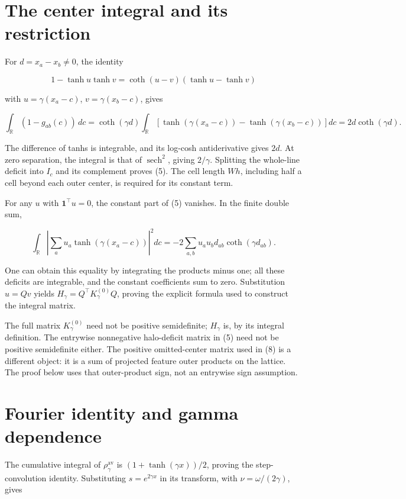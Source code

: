 \documentclass[11pt]{article}
\begin{document}
\clearpage\appendix
\section{The center integral and its restriction}

For \(d=x_a-x_b\ne0\), the identity

\[
1-\tanh u\tanh v=\coth(u-v)(\tanh u-\tanh v)
\]

with \(u=\gamma(x_a-c)\), \(v=\gamma(x_b-c)\), gives

\[
\int_{\mathbb R}(1-g_{ab}(c))\,dc
=\coth(\gamma d)\int_{\mathbb R}
[\tanh(\gamma(x_a-c))-\tanh(\gamma(x_b-c))]dc
=2d\coth(\gamma d).
\]

The difference of tanhs is integrable, and its log-cosh antiderivative gives \(2d\). At zero separation, the integral is that of \(\operatorname{sech}^2\), giving \(2/\gamma\). Splitting the whole-line deficit into \(I_c\) and its complement proves (5). The cell length \(Wh\), including half a cell beyond each outer center, is required for its constant term.

For any \(u\) with \(\mathbf1^\top u=0\), the constant part of (5) vanishes. In the finite double sum,

\[
\int_{\mathbb R}\left|\sum_a u_a\tanh(\gamma(x_a-c))\right|^2dc
=-2\sum_{a,b}u_a u_b d_{ab}\coth(\gamma d_{ab}).
\]

One can obtain this equality by integrating the products minus one; all these deficits are integrable, and the constant coefficients sum to zero. Substitution \(u=Qv\) yields \(H_\gamma=Q^\top K_\gamma^{(0)}Q\), proving the explicit formula used to construct the integral matrix.

The full matrix \(K_\gamma^{(0)}\) need not be positive semidefinite; \(H_\gamma\) is, by its integral definition. The entrywise nonnegative halo-deficit matrix in (5) need not be positive semidefinite either. The positive omitted-center matrix used in (8) is a different object: it is a sum of projected feature outer products on the lattice. The proof below uses that outer-product sign, not an entrywise sign assumption.

\section{Fourier identity and gamma dependence}

The cumulative integral of \(\rho_\gamma^{\mathrm{av}}\) is \((1+\tanh(\gamma x))/2\), proving the step-convolution identity. Substituting \(s=e^{2\gamma x}\) in its transform, with \(\nu=\omega/(2\gamma)\), gives
\end{document}
